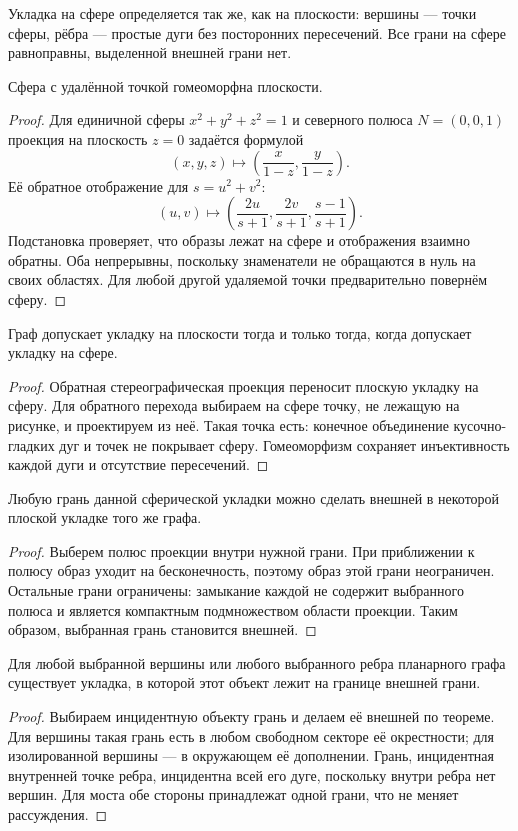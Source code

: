 \begin{definition}
Укладка на сфере определяется так же, как на плоскости: вершины — точки
сферы, рёбра — простые дуги без посторонних пересечений.
Все грани на сфере равноправны, выделенной внешней грани нет.
\end{definition}
\begin{lemma}
Сфера с удалённой точкой гомеоморфна плоскости.
\end{lemma}
\begin{proof}
Для единичной сферы \(x^2+y^2+z^2=1\) и северного полюса \(N=(0,0,1)\)
проекция на плоскость \(z=0\) задаётся формулой
\[
 (x,y,z)\longmapsto\left(\frac{x}{1-z},\frac{y}{1-z}\right).
\]
Её обратное отображение для \(s=u^2+v^2\):
\[
 (u,v)\longmapsto\left(\frac{2u}{s+1},\frac{2v}{s+1},\frac{s-1}{s+1}\right).
\]
Подстановка проверяет, что образы лежат на сфере и отображения взаимно обратны.
Оба непрерывны, поскольку знаменатели не обращаются в нуль на своих областях.
Для любой другой удаляемой точки предварительно повернём сферу.
\end{proof}


\begin{theorem}
Граф допускает укладку на плоскости тогда и только тогда,
когда допускает укладку на сфере.
\end{theorem}
\begin{proof}
Обратная стереографическая проекция переносит плоскую укладку на сферу.
Для обратного перехода выбираем на сфере точку, не лежащую на рисунке,
и проектируем из неё. Такая точка есть: конечное объединение
кусочно-гладких дуг и точек не покрывает сферу.
Гомеоморфизм сохраняет инъективность каждой дуги и отсутствие пересечений.
\end{proof}
\begin{theorem}
Любую грань данной сферической укладки можно сделать внешней в некоторой
плоской укладке того же графа.
\end{theorem}
\begin{proof}
Выберем полюс проекции внутри нужной грани. При приближении к полюсу
образ уходит на бесконечность, поэтому образ этой грани неограничен.
Остальные грани ограничены: замыкание каждой не содержит выбранного
полюса и является компактным подмножеством области проекции.
Таким образом, выбранная грань становится внешней.
\end{proof}


\begin{cor}
Для любой выбранной вершины или любого выбранного ребра планарного
графа существует укладка, в которой этот объект лежит на границе внешней грани.
\end{cor}
\begin{proof}
Выбираем инцидентную объекту грань и делаем её внешней по теореме.
Для вершины такая грань есть в любом свободном секторе её окрестности;
для изолированной вершины — в окружающем её дополнении.
Грань, инцидентная внутренней точке ребра, инцидентна всей его дуге,
поскольку внутри ребра нет вершин. Для моста обе стороны принадлежат
одной грани, что не меняет рассуждения.
\end{proof}
